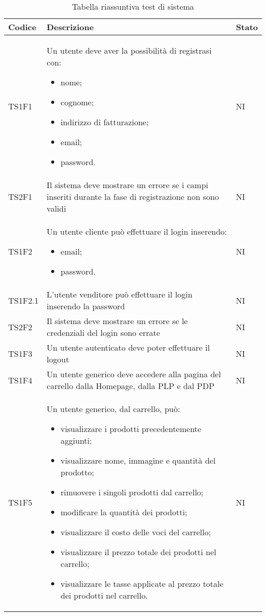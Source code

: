 {

\centering
\renewcommand{\arraystretch}{2}
\begin{longtable}{C{3cm} C{10.2cm} C{1.5cm}}
\caption{Tabella riassuntiva test di sistema}\\
\textbf{Codice} &
\textbf{Descrizione}&
\textbf{Stato}\\
\endhead


TS1F1 & Un utente deve aver la possibilità di registrasi con:
\begin{itemize}
	\item nome;
	\item cognome;
	\item indirizzo di fatturazione;
	\item email;
	\item password.
\end{itemize} & NI\\
TS2F1 & Il sistema deve mostrare un errore se
i campi inseriti durante la fase di registrazione non sono validi & NI\\
TS1F2 & Un utente cliente può effettuare il login inserendo:
\begin{itemize}
	\item email;
	\item password.
\end{itemize} &  NI\\
TS1F2.1 & L'utente venditore può effettuare il login inserendo la password &  NI\\
TS2F2 & Il sistema deve mostrare un errore se le credenziali del login sono errate & NI\\
TS1F3 & Un utente autenticato deve poter effettuare il
logout & NI\\
TS1F4 & Un utente generico deve accedere alla pagina del carrello dalla Homepage, dalla PLP e dal PDP & NI\\
TS1F5 & Un utente generico, dal carrello, può:
\begin{itemize}
	\item visualizzare i prodotti precedentemente aggiunti;
	\item visualizzare nome, immagine e quantità del prodotto;
	\item rimuovere i singoli prodotti dal carrello;
	\item modificare la quantità dei prodotti;
	\item visualizzare il costo delle voci del carrello;
	\item visualizzare il prezzo totale dei prodotti nel carrello;
	\item visualizzare le tasse applicate al prezzo totale dei prodotti nel carrello.
\end{itemize}
& NI\\


\end{longtable}}
